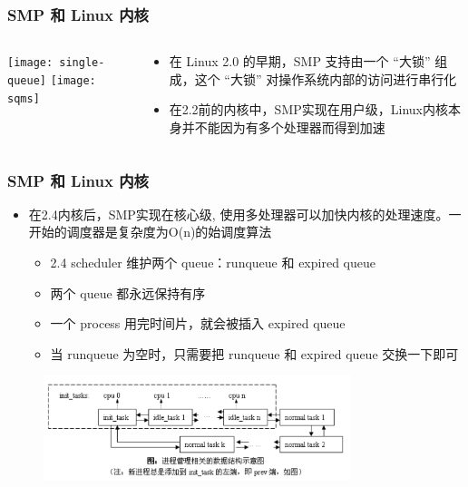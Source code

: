 \begin{frame}
	\frametitle{SMP 和 Linux 内核}
	\begin{columns}
	\begin{column}{.4\textwidth}
	\Large \centering
	
    \texttt{[image: single-queue]}
	\texttt{[image: sqms]}	
	\end{column}
	
	\begin{column}{.6\textwidth}
\begin{itemize}
	\item 在 Linux 2.0 的早期，SMP 支持由一个 “大锁” 组成，这个 “大锁” 对操作系统内部的访问进行串行化
	\item 在2.2前的内核中，SMP实现在用户级，Linux内核本身并不能因为有多个处理器而得到加速

	\end{itemize}

	\end{column}
\end{columns}
\end{frame}


\begin{frame}
	\frametitle{SMP 和 Linux 内核}
	
	\begin{itemize}
		
		\item 在2.4内核后，SMP实现在核心级, 使用多处理器可以加快内核的处理速度。一开始的调度器是复杂度为O(n)的始调度算法
		
		\begin{itemize}
			\item 2.4 scheduler 维护两个 queue：runqueue 和 expired queue
			\item 两个 queue 都永远保持有序
			\item 一个 process 用完时间片，就会被插入 expired queue
			\item 当 runqueue 为空时，只需要把 runqueue 和 expired queue 交换一下即可
		\end{itemize}
	\end{itemize}
	
    \begin{figure}
        \includegraphics[width=0.8\textwidth,natwidth=1011,natheight=343]{figs/linux-2.4-sched.png}
    \end{figure}

\end{frame}

